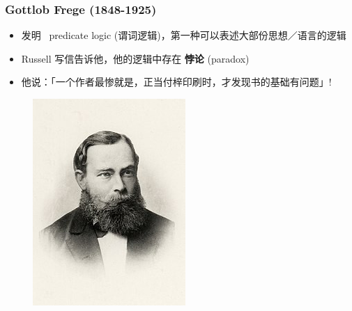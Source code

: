 \documentclass[17pt]{beamer}
\begin{document}
\begin{frame}
\frametitle{Gottlob Frege (1848-1925)}
\fontsize{15}{15}\selectfont
\begin{minipage}[t]{0.55\linewidth}
	\begin{itemize}
		\item 发明 {\color{red}\ predicate logic} (谓词逻辑)，第一种可以表述大部份思想／语言的逻辑
		\item Russell 写信告诉他，他的逻辑中存在 \textbf{悖论} (paradox)
		\item 他说：「一个作者最惨就是，正当付梓印刷时，才发现书的基础有问题」!
	\end{itemize}
\end{minipage}
\hfill
\begin{minipage}[t]{0.4\linewidth}
	\begin{figure}[H]
		\includegraphics[scale=0.55]{Frege.jpg}
	\end{figure}
\end{minipage}
\end{frame}
\end{document}
